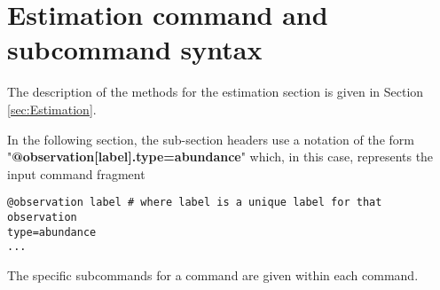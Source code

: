 \subsection{}


\subsection{}


\subsection{}


\subsection{}


\subsection{}


\section{Estimation command and subcommand syntax\label{syntax:Estimation}}

The description of the methods for the estimation section is given in Section \ref{sec:Estimation}.

In the following section, the sub-section headers use a notation of the form "\textbf {@observation[label].type=abundance}" which, in this case, represents the input command fragment
{\small{\begin{verbatim}
@observation label # where label is a unique label for that observation
type=abundance
...
\end{verbatim}}}
The specific subcommands for a command are given within each command.

\subsection{}


\subsection{}


